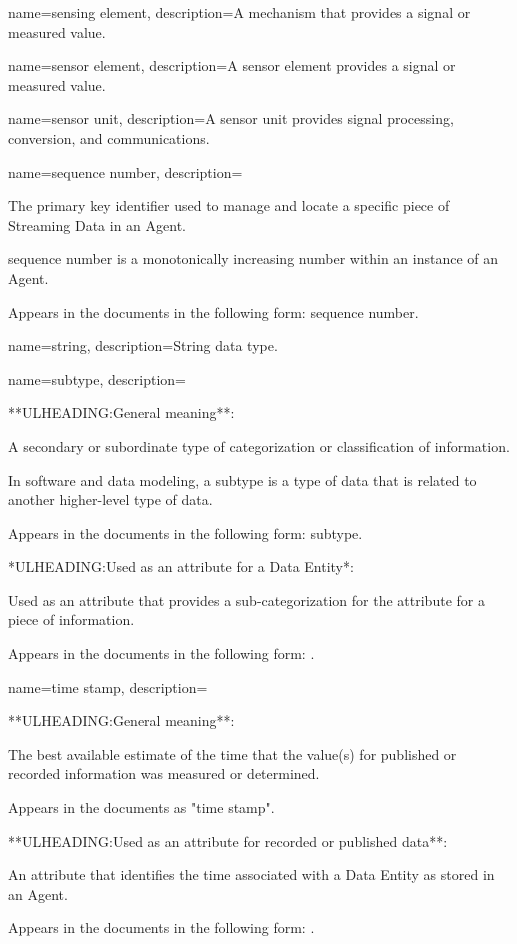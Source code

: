{
    name={sensing element},
	description={A mechanism that provides a signal or measured value.}
}

{
    name={sensor element},
	description={A \gls{sensor element} provides a signal or measured value.}
}

{
    name={sensor unit},
	description={A \gls{sensor unit} provides signal processing, conversion, and communications.}
}

{
    name={sequence number},
	description={
	The primary key identifier used to manage and locate a specific piece of \gls{Streaming Data} in an \gls{Agent}.

	\gls{sequence number} is a monotonically increasing number within an instance of an \gls{Agent}.

	Appears in the documents in the following form: \gls{sequence number}.
}
}

{
    name={string},
	description={String data type.}
}

{
    name={subtype},
	description={
	**ULHEADING:General meaning**:

	A secondary or subordinate type of categorization or classification of information.

	In software and data modeling, a subtype is a type of data that is related to another higher-level type of data.

	Appears in the documents in the following form: subtype.

	*ULHEADING:Used as an attribute for a \gls{Data Entity}*:

	Used as an attribute that provides a sub-categorization for the  attribute for a piece of information.

	Appears in the documents in the following form: .
}
}

{
    name={time stamp},
	description={
	**ULHEADING:General meaning**:

	The best available estimate of the time that the value(s) for published or recorded information was measured or determined.

	Appears in the documents as "time stamp".

	**ULHEADING:Used as an attribute for recorded or published data**:

	An attribute that identifies the time associated with a \gls{Data Entity} as stored in an \gls{Agent}.

	Appears in the documents in the following form: .
}
}


